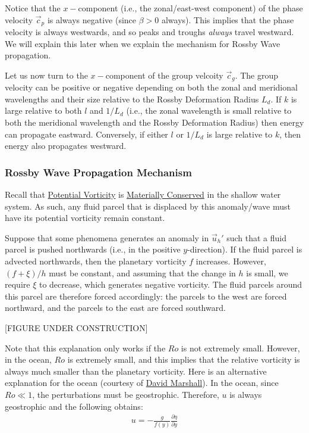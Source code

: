 Notice that the $x-$component (i.e., the zonal/east-west component) of the phase velocity $\vec{c}_p$ is always negative (since $\beta>0$ always). This implies that the phase velocity is always westwards, and so peaks and troughs \textit{always} travel westward. We will explain this later when we explain the mechanism for Rossby Wave propagation.

Let us now turn to the $x-$component of the group velcoity $\vec{c}_g$. The group velocity can be positive or negative depending on both the zonal and meridional wavelengths and their size relative to the Rossby Deformation Radius $L_d$. If $k$ is large relative to both $l$ and $1/L_d$ (i.e., the zonal wavelength is small relative to both the meridional wavelength and the Rossby Deformation Radius) then energy can propagate eastward. Conversely, if either $l$ or $1/L_d$ is large relative to $k$, then energy also propagates westward.

\subsubsection{Rossby Wave Propagation Mechanism}

Recall that \hyperref[PV]{Potential Vorticity} is \hyperref[Cons PV Box]{Materially Conserved} in the shallow water system. As such, any fluid parcel that is displaced by this anomaly/wave must have its potential vorticity remain constant.

Suppose that some phenomena generates an anomaly in $\vec{u}_h'$ such that a fluid parcel is pushed northwards (i.e., in the positive $y$-direction). If the fluid parcel is advected northwards, then the planetary vorticity $f$ increases. However, $(f+\xi)/h$ must be constant, and assuming that the change in $h$ is small, we require $\xi$ to decrease, which generates negative vorticity. The fluid parcels around this parcel are therefore forced accordingly: the parcels to the west are forced northward, and the parcels to the east are forced southward.

[FIGURE UNDER CONSTRUCTION]

Note that this explanation only works if the $Ro$ is not extremely small. However, in the ocean, $Ro$ is extremely small, and this implies that the relative vorticity is always much smaller than the planetary vorticity. Here is an alternative explanation for the ocean (courtesy of \href{https://www.physics.ox.ac.uk/our-people/marshalld}{David Marshall}). In the ocean, since $Ro\ll 1$, the perturbations must be geostrophic. Therefore, $u$ is always geostrophic and the following obtains:
\begin{align*}
    u = - \frac{g}{f(y)}\frac{\partial \eta}{\partial y}
\end{align*}

